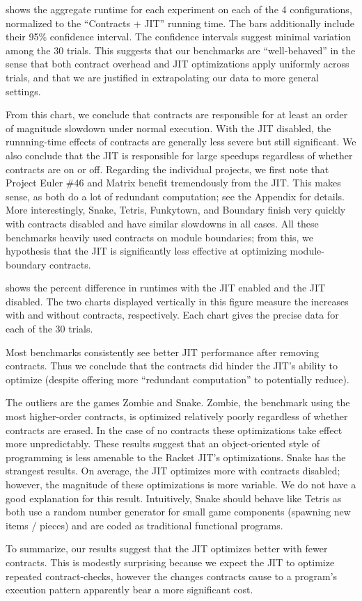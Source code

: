 

 shows the aggregate runtime for each experiment on each of the 4 configurations, normalized to the ``Contracts + JIT'' running time.
The bars additionally include their 95\% confidence interval.
The confidence intervals suggest minimal variation among the 30 trials.
This suggests that our benchmarks are ``well-behaved'' in the sense that both contract overhead and JIT optimizations apply uniformly across trials, and that we are justified in extrapolating our data to more general settings.

From this chart, we conclude that contracts are responsible for at least an order of magnitude slowdown under normal execution.
With the JIT disabled, the runnning-time effects of contracts are generally less severe but still significant.
We also conclude that the JIT is responsible for large speedups regardless of whether contracts are on or off.
Regarding the individual projects, we first note that Project Euler \#46 and Matrix benefit tremendously from the JIT.
This makes sense, as both do a lot of redundant computation; see the Appendix for details.
More interestingly, Snake, Tetris, Funkytown, and Boundary finish very quickly with contracts disabled and have similar slowdowns in all cases.
All these benchmarks heavily used contracts on module boundaries; from this, we hypothesis that the JIT is significantly less effective at optimizing module-boundary contracts.

\newpage


 shows the percent difference in runtimes with the JIT enabled and the JIT disabled.
The two charts displayed vertically in this figure measure the increases with and without contracts, respectively.
Each chart gives the precise data for each of the 30 trials.

\newpage

Most benchmarks consistently see better JIT performance after removing contracts.
Thus we conclude that the contracts did hinder the JIT's ability to optimize (despite offering more ``redundant computation'' to potentially reduce).

The outliers are the games Zombie and Snake.
Zombie, the benchmark using the most higher-order contracts, is optimized relatively poorly regardless of whether contracts are erased.
In the case of no contracts these optimizations take effect more unpredictably.
These results suggest that an object-oriented style of programming is less amenable to the Racket JIT's optimizations.
Snake has the strangest results.
On average, the JIT optimizes more with contracts disabled; however, the magnitude of these optimizations is more variable.
We do not have a good explanation for this result.
Intuitively, Snake should behave like Tetris as both use a random number generator for small game components (spawning new items / pieces) and are coded as traditional functional programs.

To summarize, our results suggest that the JIT optimizes better with fewer contracts.
This is modestly surprising because we expect the JIT to optimize repeated contract-checks, however the changes contracts cause to a program's execution pattern apparently bear a more significant cost.

